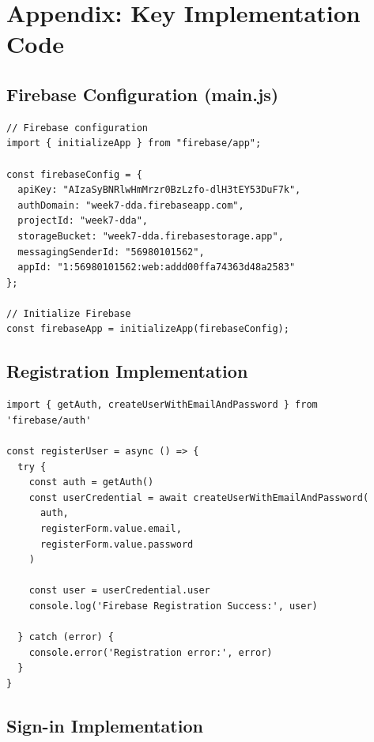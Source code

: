 \documentclass[11pt,a4paper]{article}
\begin{document}
\newpage


\section{Appendix: Key Implementation Code}

\subsection{Firebase Configuration (main.js)}

\begin{lstlisting}[caption=Firebase initialization in main.js]
// Firebase configuration
import { initializeApp } from "firebase/app";

const firebaseConfig = {
  apiKey: "AIzaSyBNRlwHmMrzr0BzLzfo-dlH3tEY53DuF7k",
  authDomain: "week7-dda.firebaseapp.com",
  projectId: "week7-dda",
  storageBucket: "week7-dda.firebasestorage.app",
  messagingSenderId: "56980101562",
  appId: "1:56980101562:web:addd00ffa74363d48a2583"
};

// Initialize Firebase
const firebaseApp = initializeApp(firebaseConfig);
\end{lstlisting}

\subsection{Registration Implementation}

\begin{lstlisting}[caption=Key registration function from FirebaseRegisterView.vue]
import { getAuth, createUserWithEmailAndPassword } from 'firebase/auth'

const registerUser = async () => {
  try {
    const auth = getAuth()
    const userCredential = await createUserWithEmailAndPassword(
      auth, 
      registerForm.value.email, 
      registerForm.value.password
    )
    
    const user = userCredential.user
    console.log('Firebase Registration Success:', user)
    
  } catch (error) {
    console.error('Registration error:', error)
  }
}
\end{lstlisting}

\subsection{Sign-in Implementation}
\end{document}
